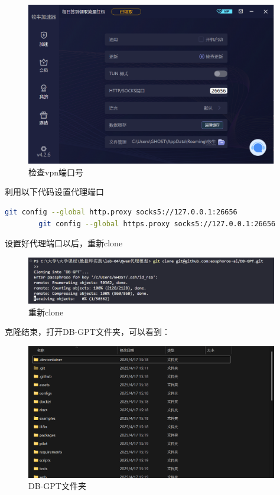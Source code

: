 \documentclass{article}
\begin{document}
	\begin{figure}[H]
		\centering
		\includegraphics[width=11cm]{./images/8.检查vpn端口号.png}
		\caption{检查vpn端口号}
	\end{figure}
	
	利用以下代码设置代理端口
	
	\begin{lstlisting}[language=bash, title=uv安装, tabsize=4]
		git config --global http.proxy socks5://127.0.0.1:26656
		git config --global https.proxy socks5://127.0.0.1:26656
	\end{lstlisting}
	
	设置好代理端口以后，重新clone
	
	\begin{figure}[H]
		\centering
		\includegraphics[width=11cm]{./images/9.重新clone.png}
		\caption{重新clone}
	\end{figure}
	
	克隆结束，打开DB-GPT文件夹，可以看到：
	
	\begin{figure}[H]
		\centering
		\includegraphics[width=11cm]{./images/10.DB-GPT文件夹.png}
		\caption{DB-GPT文件夹}
	\end{figure}
	
\end{document}
